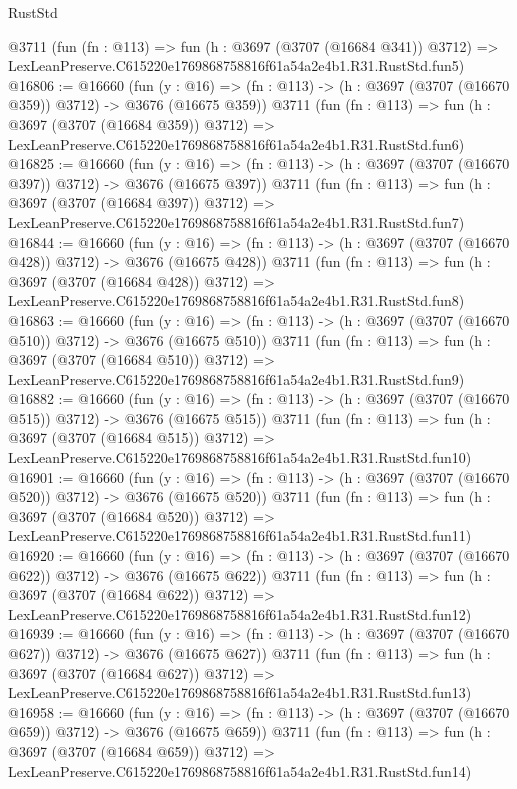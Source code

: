 \begin{lexlean}{RustStd}
\begin{coremodule}
    @3711
    (fun (fn : @113) =>
    fun (h : @3697 (@3707 (@16684 @341)) @3712) =>
    LexLeanPreserve.C615220e1769868758816f61a54a2e4b1.R31.RustStd.fun5)
@16806 := @16660
    (fun (y : @16) => (fn : @113) -> (h : @3697 (@3707 (@16670 @359)) @3712) -> @3676 (@16675 @359))
    @3711
    (fun (fn : @113) =>
    fun (h : @3697 (@3707 (@16684 @359)) @3712) =>
    LexLeanPreserve.C615220e1769868758816f61a54a2e4b1.R31.RustStd.fun6)
@16825 := @16660
    (fun (y : @16) => (fn : @113) -> (h : @3697 (@3707 (@16670 @397)) @3712) -> @3676 (@16675 @397))
    @3711
    (fun (fn : @113) =>
    fun (h : @3697 (@3707 (@16684 @397)) @3712) =>
    LexLeanPreserve.C615220e1769868758816f61a54a2e4b1.R31.RustStd.fun7)
@16844 := @16660
    (fun (y : @16) => (fn : @113) -> (h : @3697 (@3707 (@16670 @428)) @3712) -> @3676 (@16675 @428))
    @3711
    (fun (fn : @113) =>
    fun (h : @3697 (@3707 (@16684 @428)) @3712) =>
    LexLeanPreserve.C615220e1769868758816f61a54a2e4b1.R31.RustStd.fun8)
@16863 := @16660
    (fun (y : @16) => (fn : @113) -> (h : @3697 (@3707 (@16670 @510)) @3712) -> @3676 (@16675 @510))
    @3711
    (fun (fn : @113) =>
    fun (h : @3697 (@3707 (@16684 @510)) @3712) =>
    LexLeanPreserve.C615220e1769868758816f61a54a2e4b1.R31.RustStd.fun9)
@16882 := @16660
    (fun (y : @16) => (fn : @113) -> (h : @3697 (@3707 (@16670 @515)) @3712) -> @3676 (@16675 @515))
    @3711
    (fun (fn : @113) =>
    fun (h : @3697 (@3707 (@16684 @515)) @3712) =>
    LexLeanPreserve.C615220e1769868758816f61a54a2e4b1.R31.RustStd.fun10)
@16901 := @16660
    (fun (y : @16) => (fn : @113) -> (h : @3697 (@3707 (@16670 @520)) @3712) -> @3676 (@16675 @520))
    @3711
    (fun (fn : @113) =>
    fun (h : @3697 (@3707 (@16684 @520)) @3712) =>
    LexLeanPreserve.C615220e1769868758816f61a54a2e4b1.R31.RustStd.fun11)
@16920 := @16660
    (fun (y : @16) => (fn : @113) -> (h : @3697 (@3707 (@16670 @622)) @3712) -> @3676 (@16675 @622))
    @3711
    (fun (fn : @113) =>
    fun (h : @3697 (@3707 (@16684 @622)) @3712) =>
    LexLeanPreserve.C615220e1769868758816f61a54a2e4b1.R31.RustStd.fun12)
@16939 := @16660
    (fun (y : @16) => (fn : @113) -> (h : @3697 (@3707 (@16670 @627)) @3712) -> @3676 (@16675 @627))
    @3711
    (fun (fn : @113) =>
    fun (h : @3697 (@3707 (@16684 @627)) @3712) =>
    LexLeanPreserve.C615220e1769868758816f61a54a2e4b1.R31.RustStd.fun13)
@16958 := @16660
    (fun (y : @16) => (fn : @113) -> (h : @3697 (@3707 (@16670 @659)) @3712) -> @3676 (@16675 @659))
    @3711
    (fun (fn : @113) =>
    fun (h : @3697 (@3707 (@16684 @659)) @3712) =>
    LexLeanPreserve.C615220e1769868758816f61a54a2e4b1.R31.RustStd.fun14)

\end{coremodule}
\end{lexlean}
